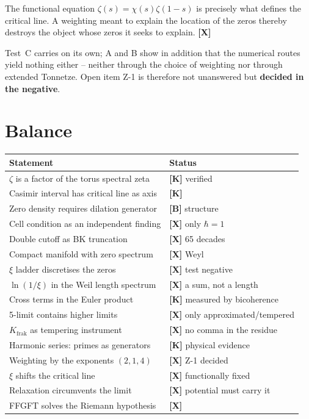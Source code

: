 \begin{keyresult}
The functional equation $\zeta(s) = \chi(s)\zeta(1-s)$ is precisely what
defines the critical line. A weighting meant to explain the location of
the zeros thereby destroys the object whose zeros it seeks to explain.
\textbf{[X]}
\end{keyresult}

Test~C carries on its own; A and B show in addition that the numerical
routes yield nothing either -- neither through the choice of weighting
nor through extended Tonnetze. Open item Z-1 is therefore not
unanswered but \textbf{decided in the negative}.

\section{Balance}

\begin{center}
\begin{tabular}{ll}
\toprule
Statement & Status \\
\midrule
$\zeta$ is a factor of the torus spectral zeta & \textbf{[K]} verified \\
Casimir interval has critical line as axis & \textbf{[K]} \\
Zero density requires dilation generator & \textbf{[B]} structure \\
Cell condition as an independent finding & \textbf{[X]} only $\hbar = 1$ \\
Double cutoff as BK truncation & \textbf{[X]} 65 decades \\
Compact manifold with zero spectrum & \textbf{[X]} Weyl \\
$\xi$ ladder discretises the zeros & \textbf{[X]} test negative \\
$\ln(1/\xi)$ in the Weil length spectrum & \textbf{[X]} a sum, not a length \\
Cross terms in the Euler product & \textbf{[K]} measured by bicoherence \\
5-limit contains higher limits & \textbf{[X]} only approximated/tempered \\
$K_\text{frak}$ as tempering instrument & \textbf{[X]} no comma in the residue \\
Harmonic series: primes as generators & \textbf{[K]} physical evidence \\
Weighting by the exponents $(2,1,4)$ & \textbf{[X]} Z-1 decided \\
$\xi$ shifts the critical line & \textbf{[X]} functionally fixed \\
Relaxation circumvents the limit & \textbf{[X]} potential must carry it \\
FFGFT solves the Riemann hypothesis & \textbf{[X]} \\
\bottomrule
\end{tabular}
\end{center}

